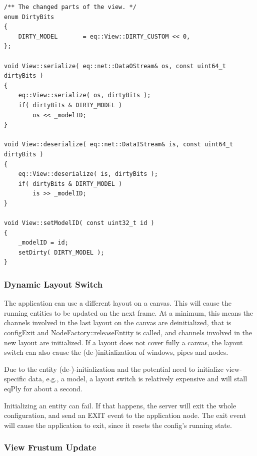 \documentclass[10pt,a4]{scrartcl}
\begin{document}
{\footnotesize\begin{lstlisting}
/** The changed parts of the view. */
enum DirtyBits
{
    DIRTY_MODEL       = eq::View::DIRTY_CUSTOM << 0,
};

void View::serialize( eq::net::DataOStream& os, const uint64_t dirtyBits )
{
    eq::View::serialize( os, dirtyBits );
    if( dirtyBits & DIRTY_MODEL )
        os << _modelID;
}

void View::deserialize( eq::net::DataIStream& is, const uint64_t dirtyBits )
{
    eq::View::deserialize( is, dirtyBits );
    if( dirtyBits & DIRTY_MODEL )
        is >> _modelID;
}

void View::setModelID( const uint32_t id )
{
    _modelID = id;
    setDirty( DIRTY_MODEL );
}
\end{lstlisting}}

\subsubsection{Dynamic Layout Switch}

The application can use a different layout on a canvas. This will cause
the running entities to be updated on the next frame. At a minimum, this
means the channels involved in the last layout on the canvas are
deinitialized, that is \textsf{configExit} and
\textsf{NodeFactory::releaseEntity} is called, and channels involved in
the new layout are initialized. If a layout does not cover fully a
canvas, the layout switch can also cause the (de-)initialization of
windows, pipes and nodes.

Due to the entity (de-)-initialization and the potential need to
initialize view-specific data, e.g., a model, a layout switch is
relatively expensive and will stall \textsf{eqPly} for about a second.

Initializing an entity can fail. If that happens, the server will exit
the whole configuration, and send an \textsf{EXIT} event to the
application node. The exit event will cause the application to exit,
since it resets the config's running state.


\subsubsection{View Frustum Update}
\end{document}

